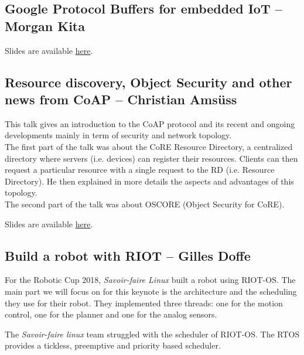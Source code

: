 \documentclass[journal, a4paper]{../IEEEtran}
\begin{document}
\subsection{Google Protocol Buffers for embedded IoT -- Morgan Kita}


Slides are available \href{http://summit.riot-os.org/2018/wp-content/uploads/sites/10/2018/09/1_2-Kita-Morgan-Protobuf.pdf}{here}.

\subsection{Resource discovery, Object Security and other news from CoAP -- Christian Amsüss}
This talk gives an introduction to the CoAP protocol and its recent and ongoing developments mainly in term of security and network topology.\\

The first part of the talk was about the CoRE Resource Directory, a centralized directory where servers (i.e. devices) can register their resources.
Clients can then request a particular resource with a single request to the RD (i.e. Resource Directory).
He then explained in more details the aspects and advantages of this topology.\\

The second part of the talk was about OSCORE (Object Security for CoRE).



Slides are available \href{http://summit.riot-os.org/2018/wp-content/uploads/sites/10/2018/09/1_3-Christian-Asmuess-CoAP-RD.pdf}{here}.

\subsection{Build a robot with RIOT -- Gilles Doffe}
For the Robotic Cup 2018, \textit{Savoir-faire Linux} built a robot using RIOT-OS.
The main part we will focus on for this keynote is the architecture and the scheduling they use for their robot.
They implemented three threads: one for the motion control, one for the planner and one for the analog sensors.
 
The \textit{Savoir-faire linux} team struggled with the scheduler of RIOT-OS. 
The RTOS provides a tickless, preemptive and priority based scheduler.
\end{document}
